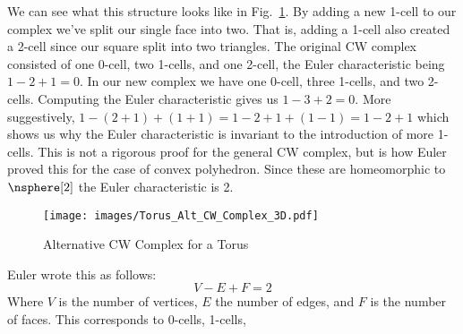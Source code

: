 \documentclass{book}                                                           %
\begin{document}
            \hfill
            \par\vspace{2.5ex}
            We can see what this structure looks like in
            Fig.~\ref{fig:Alt_CW_Complex_for_Torus_3D}. By adding a new 1-cell
            to our complex we've split our single face into two. That is, adding
            a 1-cell also created a 2-cell since our square split into two
            triangles. The original CW complex consisted of one 0-cell, two
            1-cells, and one 2-cell, the Euler characteristic being $1-2+1=0$.
            In our new complex we have one 0-cell, three 1-cells, and two
            2-cells. Computing the Euler characteristic gives us $1-3+2=0$. More
            suggestively, $1-(2+1)+(1+1)=1-2+1+(1-1)=1-2+1$ which shows us why
            the Euler characteristic is invariant to the introduction of more
            1-cells. This is not a rigorous proof for the general CW complex,
            but is how Euler proved this for the case of convex polyhedron.
            Since these are homeomorphic to $\nsphere[2]$ the Euler
            characteristic is 2.
            \begin{figure}
                \centering
                \captionsetup{type=figure}
                \if{}
                    \texttt{[image: images/Torus\_Alt\_CW\_Complex\_3D.pdf]}
                \fi
                \caption{Alternative CW Complex for a Torus}
                \label{fig:Alt_CW_Complex_for_Torus_3D}
            \end{figure}
            Euler wrote this as follows:
            \begin{equation}
                V-E+F=2
            \end{equation}
            Where $V$ is the number of vertices, $E$ the number of edges, and
            $F$ is the number of faces. This corresponds to 0-cells, 1-cells,
\end{document}
